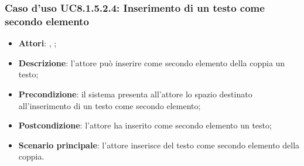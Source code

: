 		\subsubsection{Caso d'uso UC8.1.5.2.4: Inserimento di un testo come secondo elemento}
		\begin{itemize}
			\item \textbf{Attori}: \uau, \uaupro;
			\item \textbf{Descrizione}: l'attore può inserire come secondo elemento della coppia un testo;
			\item \textbf{Precondizione}: il sistema presenta all'attore lo spazio destinato all'inserimento di un testo come secondo elemento;
			\item \textbf{Postcondizione}: l'attore ha inserito come secondo elemento un testo;
			\item \textbf{Scenario principale}: l'attore inserisce del testo come secondo elemento della coppia.
		\end{itemize}
	

